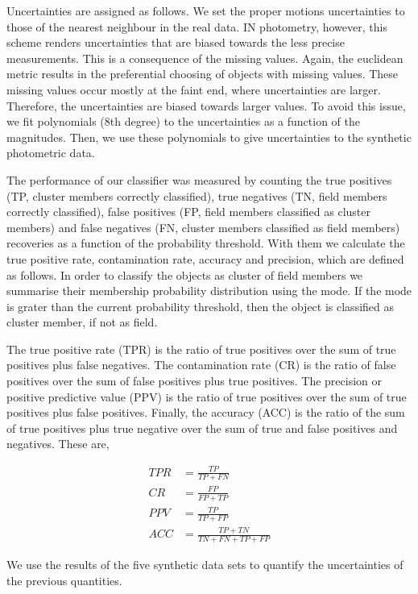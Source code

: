 Uncertainties are assigned as follows. We set the proper motions uncertainties to those of the nearest neighbour in the real data. IN photometry, however, this scheme renders uncertainties that are biased towards the less precise measurements. This is a consequence of the missing values. Again, the euclidean metric results in the preferential choosing of objects with missing values. These missing values occur mostly at the faint end, where uncertainties are larger. Therefore, the uncertainties are biased towards larger values. To avoid this issue, we fit polynomials (8th degree) to the uncertainties as a function of the magnitudes. Then, we use these polynomials to give uncertainties to the synthetic photometric data.

The performance of our classifier was measured by counting the true positives (TP, cluster members correctly classified), true negatives (TN, field members correctly classified), false positives (FP, field members classified as cluster members) and false negatives (FN, cluster members classified as field members) recoveries as a function of the probability threshold. With them we calculate the true positive rate, contamination rate, accuracy and precision, which are defined as follows. In order to classify the objects as cluster of field members we summarise their membership probability distribution using the mode. If the mode is grater than the current probability threshold, then the object is classified as cluster member, if not as field.

The true positive rate (TPR) is the ratio of true positives over the sum of true positives plus false negatives. The contamination rate (CR) is the ratio of false positives over the sum of false positives plus true positives. The precision or positive predictive value (PPV) is the ratio of true positives over the sum of true positives plus false positives. Finally, the accuracy (ACC) is the ratio of the sum of true positives plus true negative over the sum of true and false positives and negatives. These are,

\begin{align}
TPR &= \frac{TP}{TP+FN} \nonumber \\
CR   &= \frac{FP}{FP+TP} \nonumber \\
PPV &= \frac{TP}{TP+FP} \nonumber \\
ACC &= \frac{TP+TN}{TN+FN+TP+FP} \nonumber
\end{align}

We use the results of the five synthetic data sets to quantify the uncertainties of the previous quantities. 

